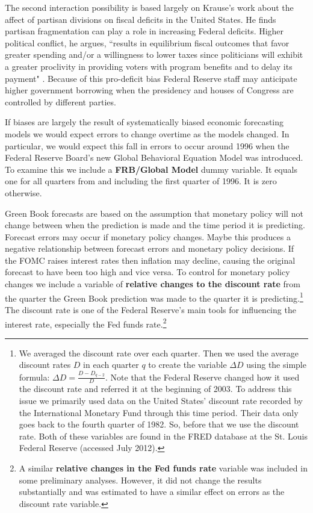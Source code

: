 \documentclass[a4paper]{article}\usepackage{graphicx, color}
\begin{document}
The second interaction possibility is based largely on Krause's \citeyearpar{Krause2000} work about the affect of partisan divisions on fiscal deficits in the United States. He finds partisan fragmentation can play a role in increasing Federal deficits. Higher political conflict, he argues, ``results in equilibrium fiscal outcomes that favor greater spending and/or a willingness to lower taxes since politicians will exhibit a greater proclivity in providing voters with program benefits and to delay its payment" \citep[][542]{Krause2000}. Because of this pro-deficit bias Federal Reserve staff may anticipate higher government borrowing when the presidency and houses of Congress are controlled by different parties. 

If biases are largely the result of systematically biased economic forecasting models we would expect errors to change overtime as the models changed. In particular, we would expect this fall in errors to occur around 1996 when the Federal Reserve Board's new Global Behavioral Equation Model was introduced. To examine this we include a {\bf{FRB/Global Model}} dummy variable. It equals one for all quarters from and including the first quarter of 1996. It is zero otherwise.

Green Book forecasts are based on the assumption that monetary policy will not change between when the prediction is made and the time period it is predicting. Forecast errors may occur if monetary policy changes. Maybe this produces a negative relationship between forecast errors and monetary policy decisions. If the FOMC raises interest rates then inflation may decline, causing the original forecast to have been too high and vice versa. To control for monetary policy changes we include a variable of {\bf{relative changes to the discount rate}} from the quarter the Green Book prediction was made to the quarter it is predicting.\footnote{We averaged the discount rate over each quarter. Then we used the average discount rates $D$ in each quarter $q$ to create the variable $\Delta D$ using the simple formula: $\Delta D = \frac{D - D_{q-2}}{D}$. Note that the Federal Reserve changed how it used the discount rate and referred it at the beginning of 2003. To address this issue we primarily used data on the United States' discount rate recorded by the International Monetary Fund through this time period. Their data only goes back to the fourth quarter of 1982. So, before that we use the discount rate. Both of these variables are found in the FRED database at the St. Louis Federal Reserve (accessed July 2012). } The discount rate is one of the Federal Reserve's main tools for influencing the interest rate, especially the Fed funds rate.\footnote{A similar {\bf{relative changes in the Fed funds rate}} variable was included in some preliminary analyses. However, it did not change the results substantially and was estimated to have a similar effect on errors as the discount rate variable.}
\end{document}
